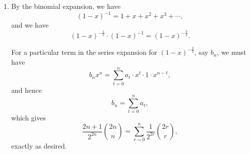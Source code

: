 \begin{enumerate}
    \item By the binomial expansion, we have
          \[
              (1 - x)^{-1} = 1 + x + x^2 + x^3 + \cdots,
          \]
          and we have
          \[
              (1 - x)^{-\frac{1}{2}} \cdot (1 - x)^{-1} = (1 - x)^{-\frac{3}{2}}.
          \]

          For a particular term in the series expansion for \((1 - x)^{-\frac{3}{2}}\), say \(b_n\), we must have
          \[
              b_n x^n = \sum_{t = 0}^{n} a_t \cdot x^t \cdot 1 \cdot x^{n - t},
          \]
          and hence
          \[
              b_n = \sum_{t = 0}^{n} a_t,
          \]
          which gives
          \[
              \frac{2n + 1}{2^{2n}} \binom{2n}{n} = \sum_{r = 0}^{n} \frac{1}{2^{2r}} \binom{2r}{r},
          \]
          exactly as desired.
\end{enumerate}